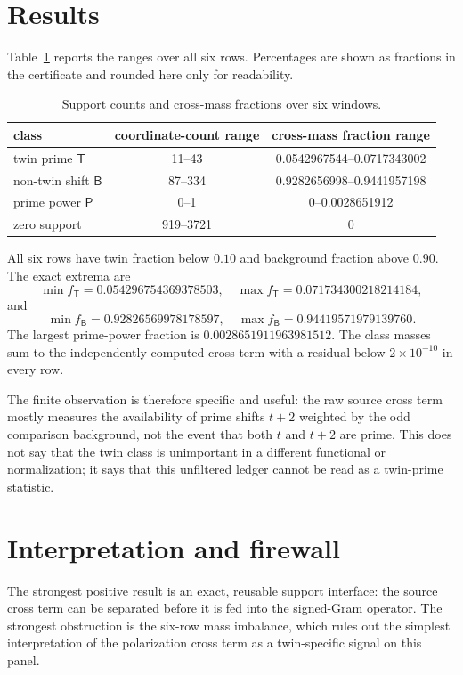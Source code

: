 \documentclass[10pt]{article}
\begin{document}
\section{Results}

Table~\ref{tab:range} reports the ranges over all six rows.  Percentages are
shown as fractions in the certificate and rounded here only for readability.
\begin{table}[ht]
\centering\small
\caption{Support counts and cross-mass fractions over six windows.}
\label{tab:range}
\begin{tabular}{lcc}
\toprule
class & coordinate-count range & cross-mass fraction range\\
\midrule
twin prime $\mathsf T$ & 11--43 & 0.0542967544--0.0717343002\\
non-twin shift $\mathsf B$ & 87--334 & 0.9282656998--0.9441957198\\
prime power $\mathsf P$ & 0--1 & 0--0.0028651912\\
zero support & 919--3721 & 0\\
\bottomrule
\end{tabular}
\end{table}

All six rows have twin fraction below $0.10$ and background fraction above
$0.90$.  The exact extrema are
\[
 \min f_{\mathsf T}=0.054296754369378503,
 \quad \max f_{\mathsf T}=0.071734300218214184,
\]
and
\[
 \min f_{\mathsf B}=0.92826569978178597,
 \quad \max f_{\mathsf B}=0.94419571979139760.
\]
The largest prime-power fraction is
$0.0028651911963981512$.  The class masses sum to the independently computed
cross term with a residual below $2\times10^{-10}$ in every row.

The finite observation is therefore specific and useful: the raw source
cross term mostly measures the availability of prime shifts $t+2$ weighted by
the odd comparison background, not the event that both $t$ and $t+2$ are
prime.  This does not say that the twin class is unimportant in a different
functional or normalization; it says that this unfiltered ledger cannot be
read as a twin-prime statistic.

\section{Interpretation and firewall}

The strongest positive result is an exact, reusable support interface: the
source cross term can be separated before it is fed into the signed-Gram
operator.  The strongest obstruction is the six-row mass imbalance, which
rules out the simplest interpretation of the polarization cross term as a
twin-specific signal on this panel.
\end{document}
